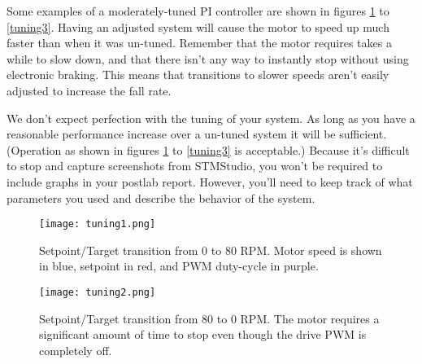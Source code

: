 \documentclass[openany,11pt,fleqn]{book} %
\begin{document}



Some examples of a moderately-tuned PI controller are shown in figures \ref{tuning1} to \ref{tuning3}. Having an adjusted system will cause the motor to speed up much faster than when it was un-tuned. Remember that the motor requires takes a while to slow down, and that there isn't any way to instantly stop without using electronic braking. This means that transitions to slower speeds aren't easily adjusted to increase the fall rate. 




We don't expect perfection with the tuning of your system. As long as you have a reasonable performance increase over a un-tuned system it will be sufficient. (Operation as shown in figures \ref{tuning1} to \ref{tuning3} is acceptable.) Because it's difficult to stop and capture screenshots from STMStudio, you won't be required to include graphs in your postlab report. However, you'll need to keep track of what parameters you used and describe the behavior of the system. 
\begin{figure}[b!]
    \begin{center}
        \hspace*{-3.4cm}
        \texttt{[image: tuning1.png]}
        \caption{Setpoint/Target transition from 0 to 80 RPM. Motor speed is shown in blue, setpoint in red, and PWM duty-cycle in purple. }
        \label{tuning1}
    \end{center}
\end{figure}

\begin{figure}[]
    \begin{center}
        \hspace*{-3.4cm}
        \texttt{[image: tuning2.png]}
        \caption{Setpoint/Target transition from 80 to 0 RPM. The motor requires a significant amount of time to stop even though the drive PWM is completely off. }
        \label{tuning2}
    \end{center}
\end{figure}
\end{document}
